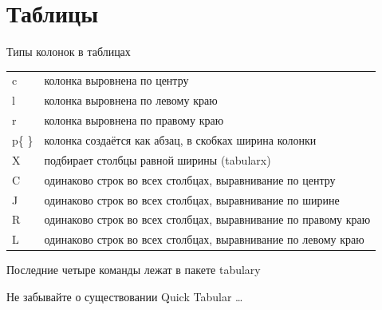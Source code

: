 \documentclass[aspectratio=169]{beamer} %
\begin{document}
\section{Таблицы} 


\begin{frame}
\begin{block}{Типы колонок в таблицах}
\centering 
	\begin{tabulary}{\textwidth}{JL}
		\toprule
			c & колонка выровнена по центру \\
			l & колонка выровнена по левому краю\\
			r & колонка выровнена по правому краю\\
	   p\{ \} & колонка создаётся как абзац, в скобках ширина колонки \\
		   X  & подбирает столбцы равной ширины (tabularx) \\
		   C  & одинаково строк во всех столбцах, выравнивание по центру  \\	  
		   J  & одинаково строк во всех столбцах, выравнивание по ширине \\
		   R  & одинаково строк во всех столбцах, выравнивание по правому краю \\
		   L  & одинаково строк во всех столбцах, выравнивание по левому краю  \\
		\bottomrule
	\end{tabulary}
\end{block}
\vspace{0.1cm} \centering
\large Последние четыре команды лежат в пакете tabulary

\alert{Не забывайте о существовании Quick Tabular \ldots}

\end{frame}
\end{document}
